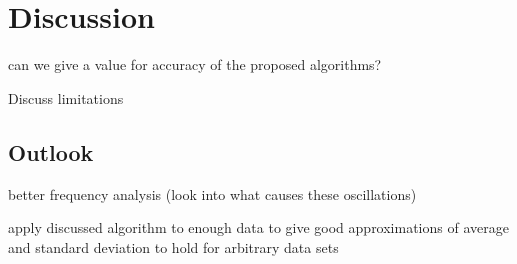\chapter{Discussion}
\label{chapter:conclusion}

can we give a value for accuracy of the proposed algorithms?

Discuss limitations

\section{Outlook}

better frequency analysis (look into what causes these oscillations)

apply discussed algorithm to enough data to give good approximations of average and standard deviation to hold for arbitrary data sets